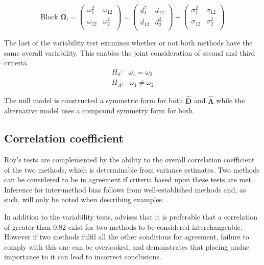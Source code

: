 \documentclass[12pt, a4paper]{report}
\theoremstyle{plain}
\theoremstyle{definition}
\theoremstyle{remark}
\begin{document}
		\begin{center}
			\[\mbox{Block } \boldsymbol{\Omega}_i = \left(\begin{array}{cc}
			\omega^2_1  & \omega_{12} \\
			\omega_{12} & \omega^2_2 \\
			\end{array}  \right)
			=  \left(
			\begin{array}{cc}
			d^2_1  & d_{12} \\
			d_{12} & d^2_2 \\
			\end{array} \right)+
			\left(
			\begin{array}{cc}
			\sigma^2_1  & \sigma_{12} \\
			\sigma_{12} & \sigma^2_2 \\
			\end{array}\right)
			\]
		\end{center}
		
	The last of the variability test examines whether or not both methods have the same overall variability. This enables the joint consideration of second and third criteria.
	\begin{eqnarray*}
		H_{0}: \mbox{ }\omega_{1}  = \omega_{2} \\
		H_{A}: \mbox{ }\omega_{1}  \neq \omega_{2}
	\end{eqnarray*}
	
	The null model is constructed a symmetric form for both $\boldsymbol{\hat{D}}$ and $\boldsymbol{\hat{\Lambda}}$ while the alternative model uses a compound symmetry form for both.
	
	

	


	

	\subsection{Correlation coefficient}
	
	Roy's tests are complemented by the ability to the overall correlation coefficient of the two methods, which is determinable from variance estimates. Two methods can be considered to be in agreement if criteria based upon these tests are met. Inference for inter-method bias follows from well-established methods and, as such, will only be noted when describing examples.
	
	
	In addition to the variability tests, \citet{ARoy2009} advises that it is preferable that a correlation of greater than $0.82$ exist for two methods to be considered interchangeable. However if two methods fulfil all the other conditions for agreement, failure to comply with this one can be overlooked, and demonstrates that placing undue importance to it can lead to incorrect conclusions.
	
\end{document}
